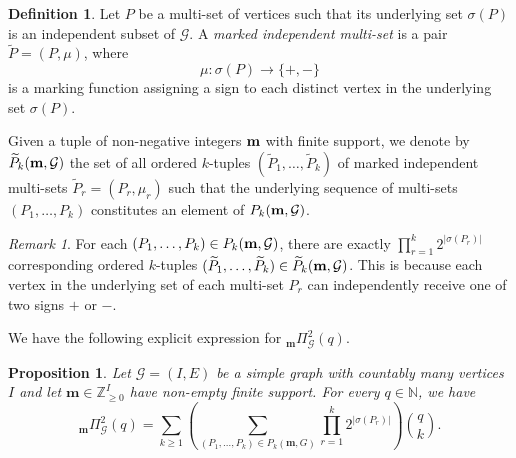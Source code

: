 \documentclass[11pt,reqno]{amsart}
\numberwithin{equation}{section} %
\newtheorem{prop}{Proposition}
\theoremstyle{definition}
\newtheorem{defn}{Definition}
\theoremstyle{remark}
\newtheorem{rem}{Remark}
\numberwithin{equation}{section}
\begin{document}
\begin{defn}
Let $P$ be a multi-set of vertices such that its underlying set $\sigma(P)$ is an independent subset of $\mathcal{G}$. A \emph{marked independent multi-set} is a pair $\widetilde{P} = (P, \mu)$, where 
\[
\mu: \sigma(P) \longrightarrow \{+, -\}
\]
is a marking function assigning a  sign to each distinct vertex in the underlying set $\sigma(P)$.

Given a tuple of non-negative integers $\bold m$ with finite support, we denote by $\widetilde{P}_k(\bold m, \mathcal{G})$ the set of all ordered $k$-tuples $(\widetilde{P}_1, \dots, \widetilde{P}_k) 
$ of marked independent multi-sets $\widetilde{P}_r = (P_r, \mu_r)$ such that the underlying sequence of multi-sets $(P_1, \dots, P_k)$ constitutes an element of $P_k(\bold m, \mathcal{G})$.
\end{defn}

\begin{rem}
    For each $(P_1, \dots, P_k) \in P_k(\bold m, \mathcal{G})$, there are exactly $\prod_{r=1}^k 2^{|\sigma(P_r)|}$ corresponding ordered $k$-tuples $(\widetilde{P}_1, \dots, \widetilde{P}_k) \in \widetilde{P}_k(\bold m, \mathcal{G})$. This is because each vertex in the underlying set  of each multi-set $P_r$ can independently receive one of two signs $+$ or $-$.
\end{rem}
We have the following explicit expression for $_{\mathbf{m}}\Pi_\mathcal{G}^{2}( q).$
\begin{prop}\label{prop2}
Let \(\mathcal{G}=(I,E)\) be a simple graph with countably many vertices $I$ and let
\(\mathbf m\in \mathbb{Z}_{\ge 0}^{I}\) have non-empty finite support. For every \(q\in\mathbb{N}\), we have
$$
_\mathbf{m}\Pi_{\mathcal G}^2(q)
=
\sum_{k\ge1}
\left(
\sum_{(P_1,\ldots,P_k)\in P_k(\mathbf m,G)}
\prod_{r=1}^k 2^{|\sigma(P_r)|}
\right)
\binom qk.
$$
\end{prop}
\end{document}
